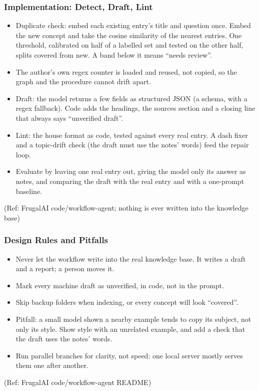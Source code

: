 \begin{frame}[fragile]\frametitle{Implementation: Detect, Draft, Lint}
\begin{itemize}
\item Duplicate check: embed each existing entry's title and question once. Embed the new concept and take the cosine similarity of the nearest entries. One threshold, calibrated on half of a labelled set and tested on the other half, splits covered from new. A band below it means ``needs review''.
\item The author's own regex counter is loaded and reused, not copied, so the graph and the procedure cannot drift apart.
\item Draft: the model returns a few fields as structured JSON (a schema, with a regex fallback). Code adds the headings, the sources section and a closing line that always says ``unverified draft''.
\item Lint: the house format as code, tested against every real entry. A dash fixer and a topic-drift check (the draft must use the notes' words) feed the repair loop.
\item Evaluate by leaving one real entry out, giving the model only its answer as notes, and comparing the draft with the real entry and with a one-prompt baseline.
\end{itemize}
{\tiny (Ref: FrugalAI code/workflow-agent; nothing is ever written into the knowledge base)}
\end{frame}

\begin{frame}[fragile]\frametitle{Design Rules and Pitfalls}
\begin{itemize}
\item Never let the workflow write into the real knowledge base. It writes a draft and a report; a person moves it.
\item Mark every machine draft as unverified, in code, not in the prompt.
\item Skip backup folders when indexing, or every concept will look ``covered''.
\item Pitfall: a small model shown a nearby example tends to copy its subject, not only its style. Show style with an unrelated example, and add a check that the draft uses the notes' words.
\item Run parallel branches for clarity, not speed: one local server mostly serves them one after another.
\end{itemize}
{\tiny (Ref: FrugalAI code/workflow-agent README)}
\end{frame}
